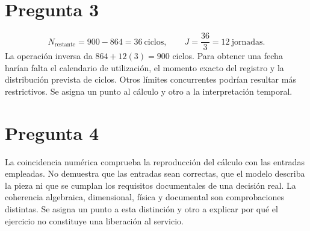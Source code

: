 \section{Pregunta 3}
\begin{equation}
N_{\mathrm{restante}}=900-864=36\ \text{ciclos},\qquad
J=\frac{36}{3}=12\ \text{jornadas}.
\end{equation}
La operación inversa da $864+12(3)=900$ ciclos. Para obtener una fecha harían falta el calendario de utilización, el momento exacto del registro y la distribución prevista de ciclos. Otros límites concurrentes podrían resultar más restrictivos. Se asigna un punto al cálculo y otro a la interpretación temporal.

\section{Pregunta 4}
La coincidencia numérica comprueba la reproducción del cálculo con las entradas empleadas. No demuestra que las entradas sean correctas, que el modelo describa la pieza ni que se cumplan los requisitos documentales de una decisión real. La coherencia algebraica, dimensional, física y documental son comprobaciones distintas. Se asigna un punto a esta distinción y otro a explicar por qué el ejercicio no constituye una liberación al servicio.

